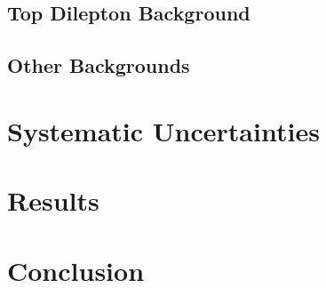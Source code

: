 \documentclass{cmspaper}
\begin{document}
  \subsection{Top Dilepton Background}
    \label{sec:bkg_dil}
    

  \subsection{Other Backgrounds}
    \label{sec:bkg_other}
%    


\section{Systematic Uncertainties}
  \label{sec:systematics}
%  


\section{Results}
  \label{sec:results}
%  

\section{Conclusion}
    \label{sec:conclusion}
%    

\clearpage

\end{document}
